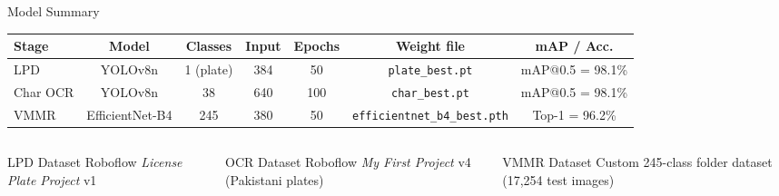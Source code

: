 \documentclass[aspectratio=169,11pt]{beamer}
\begin{document}
\begin{frame}{Model Summary}
  \centering
  \scriptsize
  \begin{tabular}{@{}lcccccc@{}}
    \toprule
    \textbf{Stage} & \textbf{Model} & \textbf{Classes} & \textbf{Input} & \textbf{Epochs} & \textbf{Weight file} & \textbf{mAP / Acc.} \\
    \midrule
    LPD & YOLOv8n & 1 (plate) & 384 & 50 & \texttt{plate\_best.pt} & mAP@0.5 = 98.1\% \\
    Char OCR & YOLOv8n & 38 & 640 & 100 & \texttt{char\_best.pt} & mAP@0.5 = 98.1\% \\
    VMMR & EfficientNet-B4 & 245 & 380 & 50 & \texttt{efficientnet\_b4\_best.pth} & Top-1 = 96.2\% \\
    \bottomrule
  \end{tabular}
  \vspace{0.8em}

  \begin{columns}[T]
    \begin{block}{LPD Dataset}
      Roboflow \emph{License Plate Project} v1
    \end{block}
    \begin{block}{OCR Dataset}
      Roboflow \emph{My First Project} v4 (Pakistani plates)
    \end{block}
    \begin{block}{VMMR Dataset}
      Custom 245-class folder dataset (17{,}254 test images)
    \end{block}
  \end{columns}
\end{frame}
\end{document}
